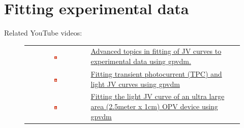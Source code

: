 \chapter{Fitting experimental data}
\label{sec:fitting}

Related YouTube videos:
\begin{figure}[H]

\begin{tabular}{ c l }

\includegraphics[width=0.05\textwidth]{./images/youtube.png}

&
\href{https://www.youtube.com/watch?v=uEj0dB-mPTQ}{Advanced topics in fitting of JV curves to experimental data using gpvdm.}\
\\
\includegraphics[width=0.05\textwidth]{./images/youtube.png}

&
\href{https://www.youtube.com/watch?v=WY_grICDP4Y}{Fitting transient photocurrent (TPC) and light JV curves using gpvdm}
\\
\includegraphics[width=0.05\textwidth]{./images/youtube.png}

&
\href{https://www.youtube.com/watch?v=61umU4hrsqk&t=58s}{Fitting the light JV curve of an ultra large area (2.5meter x 1cm) OPV device using gpvdm}

\end{tabular}
\end{figure}

